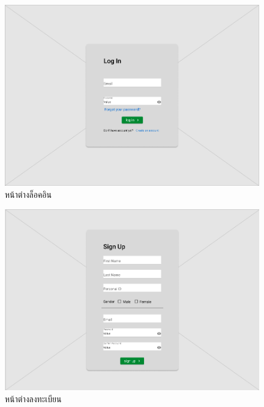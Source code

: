 \begin{enumerate}
\begin{figure}[ht]
\begin{center}
            \includegraphics[width=\linewidth]{photo/student/login.png}
          \end{center}
          \caption{หน้าต่างล็อคอิน}
          \label{fig:login}
        \end{figure}
        
        \begin{figure}[h]
          \begin{center}
            \includegraphics[width=\linewidth]{photo/student/register.png}
          \end{center}
          \caption{หน้าต่างลงทะเบียน}
          \label{fig:register}
        \end{figure}
        

\end{enumerate}
